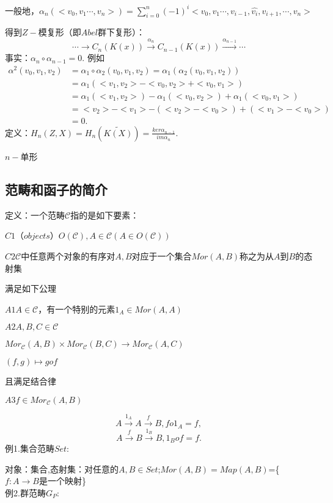\documentclass[UTF8]{article}
\begin{document}
一般地，$\alpha_{n}(<v_{0},v_{1}\cdots,v_{n}>)=\sum_{i=0}^{n}(-1)^{i}<v_{0},v_{1}\cdots,v_{i-1},\widehat{v_{i}},v_{i+1},\cdots,v_{n}>$

得到$Z-$模复形（即$Abel$群下复形）：
$$\cdots\rightarrow C_{n}(K(x))\xrightarrow{\alpha_{n}}C_{n-1}(K(x))\xrightarrow{\alpha_{n-1}} \cdots$$
事实：$\alpha_{n}\circ\alpha_{n-1}=0$.
例如
\[\begin{split}
\alpha^{2}(v_{0},v_{1},v_{2})&=\alpha_{1}\circ\alpha_{2}(v_{0},v_{1},v_{2})=\alpha_{1}(\alpha_{2}(v_{0},v_{1},v_{2}))\\
&=\alpha_{1}(<v_{1},v_{2}>-<v_{0},v_{2}>+<v_{0},v_{1}>)\\
&=\alpha_{1}(<v_{1},v_{2}>)-\alpha_{1}(<v_{0},v_{2}>)+\alpha_{1}(<v_{0},v_{1}>)\\
&=<v_{2}>-<v_{1}>-(<v_{2}>-<v_{0}>)+(<v_{1}>-<v_{0}>)\\
&=0.
\end{split}\]
定义：$H_{n}(Z,X)=H_{n}(\tilde{K(X)})=\frac{ker\alpha_{n-1}}{im\alpha_{n}}$.

$n-$单形\qquad
\subsection{范畴和函子的简介}

定义：一个范畴$\mathscr{C}$指的是如下要素：

\qquad$C1$（$objects$）$O(\mathscr{C}),A\in \mathscr{C}(A\in O(\mathscr{C}))$

\qquad$C2$$\mathscr{C}$中任意两个对象的有序对$A,B$对应于一个集合$Mor(A,B)$称之为从$A$到$B$的态射集

满足如下公理

$A1$$A\in \mathscr{C}$，有一个特别的元素$1_{A}\in Mor(A,A)$

$A2$$A,B,C\in \mathscr{C}$

\qquad\qquad\qquad$Mor_{\mathscr{C}}(A,B)\times Mor_{\mathscr{C}}(B,C)\longrightarrow Mor_{\mathscr{C}}(A,C)$

\qquad\qquad\qquad\qquad\qquad\qquad\qquad\qquad$(f,g)\longmapsto gof$

且满足结合律

$A3$$f\in Mor_{\mathscr{C}}(A,B)$

$$A\xrightarrow{1_{A}}A\xrightarrow{f}B,fo1_{A}=f,$$
$$A\xrightarrow{f}B\xrightarrow{1_{B}}B,1_{B}of=f.$$
例1.集合范畴$Set$:


对象：集合,态射集：对任意的$A,B\in Set$;$Mor(A,B)=Map(A,B)$=\{$f:A\longrightarrow B$是一个映射\}\\
例2.群范畴$G_{P}$:
\end{document}
